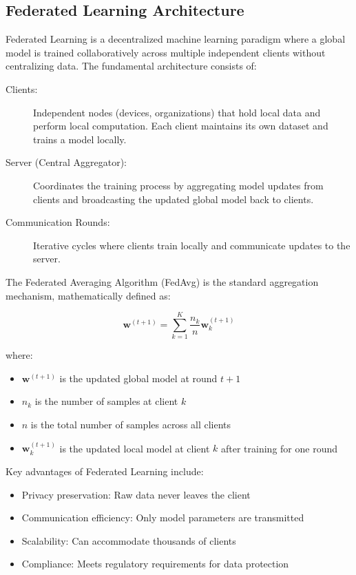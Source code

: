 \documentclass[11pt,a4paper]{report}
\begin{document}
\subsection{Federated Learning Architecture}

Federated Learning is a decentralized machine learning paradigm where a global model is trained collaboratively across multiple independent clients without centralizing data. The fundamental architecture consists of:

\begin{description}
    \item[Clients:] Independent nodes (devices, organizations) that hold local data and perform local computation. Each client maintains its own dataset and trains a model locally.
            \item[Server (Central Aggregator):] Coordinates the training process by aggregating model updates from clients and broadcasting the updated global model back to clients.
    \item[Communication Rounds:] Iterative cycles where clients train locally and communicate updates to the server.
\end{description}

The Federated Averaging Algorithm (FedAvg) is the standard aggregation mechanism, mathematically defined as:

\begin{equation}
\mathbf{w}^{(t+1)} = \sum_{k=1}^{K} \frac{n_k}{n} \mathbf{w}_k^{(t+1)}
\end{equation}

where:
\begin{itemize}
    \item $\mathbf{w}^{(t+1)}$ is the updated global model at round $t+1$
    \item $n_k$ is the number of samples at client $k$
    \item $n$ is the total number of samples across all clients
    \item $\mathbf{w}_k^{(t+1)}$ is the updated local model at client $k$ after training for one round
\end{itemize}

Key advantages of Federated Learning include:
\begin{itemize}
    \item Privacy preservation: Raw data never leaves the client
    \item Communication efficiency: Only model parameters are transmitted
    \item Scalability: Can accommodate thousands of clients
    \item Compliance: Meets regulatory requirements for data protection
\end{itemize}
\end{document}
